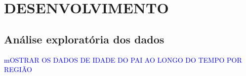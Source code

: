 \chapter{DESENVOLVIMENTO} %

\section{Análise exploratória dos dados}

\textcolor{blue}{mOSTRAR OS DADOS DE IDADE DO PAI AO LONGO DO TEMPO POR REGIÃO}



\begin{comment}
    ■ R packages: mi, mice, and Amelia packages include features for
model checking with core functions for imputing missing values
(van Buuren & Groothuis-Oudshoorn, 2011; Honaker et al., 2011;

Su et al., 2011). VIM and miP packages visualise imputed data
(Brix, 2012; Templ et al., 2015). These packages function to
graphically compare distribution of observed and imputed data, by
offering scatterplots for plotting observed and imputed data against
another variable. The mi package has tools to produce residual
plots to check imputation models when imputing data using MICE.
Amelia software has a diagnostic feature called overimputation to
produce cross-validation plots of mean imputed values against
observed value with 90%
2011).
\end{comment}


